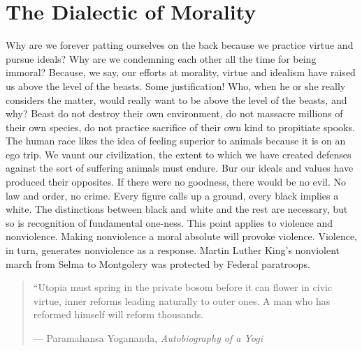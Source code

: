 \chapter{The Dialectic of Morality}

Why are we forever patting ourselves on the back because we practice virtue and pursue ideals? Why are we condemning each other all the time for being immoral? Because, we say, our efforts at morality, virtue and idealism have raised us above the level of the beasts. Some justification! Who, when he or she really considers the matter, would really want to be above the level of the beasts, and why? Beast do not destroy their own environment, do not massacre millions of their own species, do not practice sacrifice of their own kind to propitiate spooks. The human race likes the idea of feeling superior to animals because it is on an ego trip. We vaunt our civilization, the extent to which we have created defenses against the sort of suffering animals must endure. Bur our ideals and values have produced their opposites. If there were no goodness, there would be no evil. No law and order, no crime. Every figure calls up a ground, every black implies a white. The distinctions between black and white and the rest are necessary, but so is recognition of fundamental one-ness. This point applies to violence and nonviolence. Making nonviolence a moral absolute will provoke violence. Violence, in turn, generates nonviolence as a response. Martin Luther King's nonviolent march from Selma to Montgolery was protected by Federal paratroops.

\newpage
\blockquote{``Utopia must spring in the private bosom before it can flower in civic virtue, inner reforms leading naturally to outer ones. A man who has reformed himself will reform thousands.
\par\begin{flushright} --- Paramahansa Yogananda, \emph{Autobiography of a Yogi}\end{flushright}
}